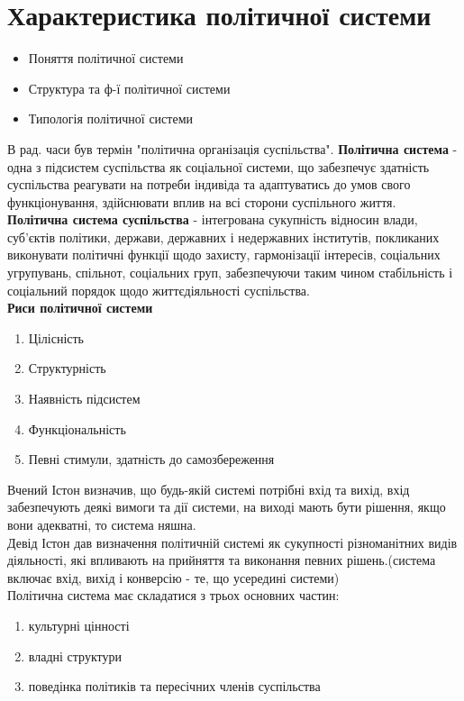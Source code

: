 \section{Характеристика політичної системи}
\begin{itemize}
\item Поняття політичної системи 
\item Структура та ф-ї політичної системи
\item Типологія політичної системи
\end{itemize}
В рад. часи був термін "політична організація суспільства". 
\textbf{Політична система} - одна з підсистем суспільства як соціальної системи, що забезпечує здатність суспільства реагувати на потреби індивіда та адаптуватись до умов свого функціонування, здійснювати вплив на всі сторони суспільного життя.\\
\textbf{Політична система суспільства} - інтегрована сукупність відносин влади, суб’єктів політики, держави, державних і недержавних інститутів, покликаних виконувати політичні функції щодо захисту, гармонізації інтересів, соціальних угрупувань, спільнот, соціальних груп, забезпечуючи таким чином стабільність і соціальний порядок щодо життєдіяльності суспільства.\\
\textbf{Риси політичної системи}
\begin{enumerate}
\item Цілісність
\item Структурність
\item Наявність підсистем
\item Функціональність
\item Певні стимули, здатність до самозбереження
\end{enumerate}
Вчений Істон визначив, що будь-якій системі потрібні вхід та  вихід, вхід забезпечують деякі вимоги та дії системи, на виході мають бути рішення, якщо вони адекватні, то система няшна.\\
Девід Істон дав визначення політичній системі як сукупності різноманітних видів діяльності, які впливають на прийняття та виконання певних рішень.(система включає вхід, вихід і конверсію - те, що усередині системи)\\
Політична система має складатися з трьох основних частин: 
\begin{enumerate}
\item культурні цінності
\item владні структури
\item поведінка політиків та пересічних членів суспільства
\end{enumerate}
